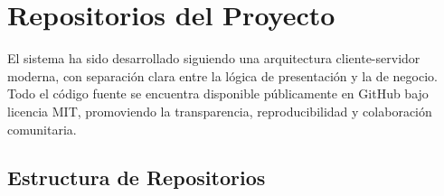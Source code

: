 \section{Repositorios del Proyecto}
\label{sec:repositorios-proyecto}

El sistema ha sido desarrollado siguiendo una arquitectura cliente-servidor moderna, con separación clara entre la lógica de presentación y la de negocio. Todo el código fuente se encuentra disponible públicamente en GitHub bajo licencia MIT, promoviendo la transparencia, reproducibilidad y colaboración comunitaria.

\subsection{Estructura de Repositorios}
\label{subsec:estructura-repositorios}

